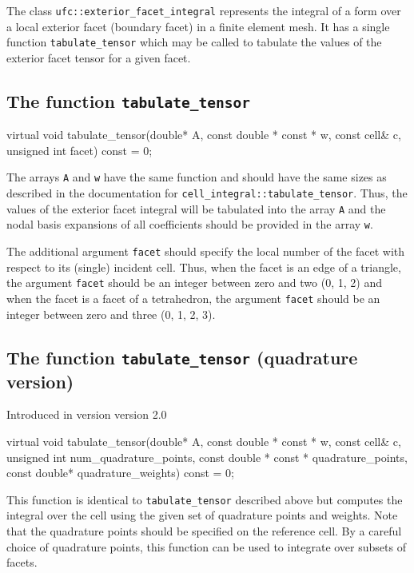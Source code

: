 The class \texttt{ufc::exterior\_facet\_integral} represents the
integral of a form over a local exterior facet (boundary facet) in a
finite element mesh. It has a single function
\texttt{tabulate\_tensor} which may be called to tabulate the values
of the exterior facet tensor for a given facet.

\subsection{The function \texttt{tabulate\_tensor}}

\begin{code}
virtual void tabulate_tensor(double* A,
                             const double * const * w,
                             const cell& c,
                             unsigned int facet) const = 0;
\end{code}

The arrays \texttt{A} and \texttt{w} have the same function and should
have the same sizes as described in the documentation for
\texttt{cell\_integral::tabulate\_tensor}. Thus, the values of the
exterior facet integral will be tabulated into the array \texttt{A}
and the nodal basis expansions of all coefficients should be provided
in the array \texttt{w}.

The additional argument \texttt{facet} should specify the local number
of the facet with respect to its (single) incident cell. Thus, when
the facet is an edge of a triangle, the argument \texttt{facet} should
be an integer between zero and two (0, 1, 2) and when the facet is a
facet of a tetrahedron, the argument \texttt{facet} should be an
integer between zero and three (0, 1, 2, 3).

\subsection{The function \texttt{tabulate\_tensor} (quadrature version)}
Introduced in version version 2.0

\begin{code}
virtual void
tabulate_tensor(double* A,
                const double * const * w,
                const cell& c,
                unsigned int num_quadrature_points,
                const double * const * quadrature_points,
                const double* quadrature_weights) const = 0;
\end{code}

This function is identical to \texttt{tabulate\_tensor} described
above but computes the integral over the cell using the given set of
quadrature points and weights. Note that the quadrature points should
be specified on the reference cell. By a careful choice of quadrature
points, this function can be used to integrate over subsets of facets.


